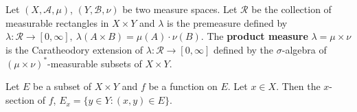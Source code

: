 \begin{definition}
	Let $(X,\mathcal{A},\mu)$, $(Y,\mathcal{B},\nu)$ be two measure spaces.
	Let $\mathcal{R}$ be the collection of measurable rectangles in $X \times Y$ and $\lambda$ is the premeasure defined by $\lambda : \mathcal{R} \to [0,\infty],\ \lambda(A \times B) = \mu(A) \cdot \nu(B)$.
	The \textbf{product measure} $\lambda = \mu \times \nu$ is the Caratheodory extension of $\lambda : \mathcal{R} \to [0,\infty]$ defined by the $\sigma$-algebra of $(\mu \times \nu)^\ast$-measurable subsets of $X \times Y$.
\end{definition}

\begin{definition}[$x$-section]
	Let $E$ be a subset of $X \times Y$ and $f$ be a function on $E$.
	Let $x \in X$.
	Then the $x$-section of $f$, $E_x = \{ y \in Y : (x,y) \in E \}$.
\end{definition}

